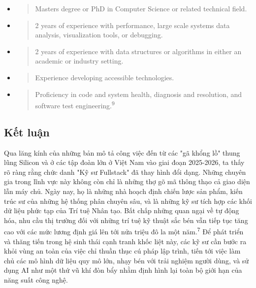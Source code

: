\documentclass[12pt,a4paper]{article}
\begin{document}
\begin{itemize}
\item
  \begin{quote}
  Master\textquotesingle s degree or PhD in Computer Science or related
  technical field.
  \end{quote}
\item
  \begin{quote}
  2 years of experience with performance, large scale systems data
  analysis, visualization tools, or debugging.
  \end{quote}
\item
  \begin{quote}
  2 years of experience with data structures or algorithms in either an
  academic or industry setting.
  \end{quote}
\item
  \begin{quote}
  Experience developing accessible technologies.
  \end{quote}
\item
  \begin{quote}
  Proficiency in code and system health, diagnosis and resolution, and
  software test engineering.\textsuperscript{9}
  \end{quote}
\end{itemize}

\subsection{Kết luận}
Qua lăng kính của những bản mô tả công việc đến từ các "gã khổng lồ"
thung lũng Silicon và ở các tập đoàn lớn ở Việt Nam vào giai đoạn 2025-2026, ta thấy rõ ràng rằng chức
danh "Kỹ sư Fullstack" đã thay hình đổi dạng. Những chuyên gia trong
lĩnh vực này không còn chỉ là những thợ gõ mã thông thạo cả giao diện
lẫn máy chủ. Ngày nay, họ là những nhà hoạch định chiến lược sản phẩm,
kiến trúc sư của những hệ thống phân chuyên sâu, và là những kỹ sư
tích hợp các khối dữ liệu phức tạp của Trí tuệ Nhân tạo. Bất chấp những quan ngại về tự động hóa, nhu cầu thị trường đối với
những trí tuệ kỹ thuật sắc bén vẫn tiếp tục tăng cao với các mức lương
định giá lên tới nửa triệu đô la một năm.\textsuperscript{7} Để phát
triển và thăng tiến trong hệ sinh thái cạnh tranh khốc liệt này, các kỹ
sư cần bước ra khỏi vùng an toàn của việc chỉ thuần thục cú pháp lập
trình, tiến tới việc làm chủ các mô hình dữ liệu quy mô lớn, nhạy bén
với trải nghiệm người dùng, và sử dụng AI như một thứ vũ khí đòn bẩy
nhằm định hình lại toàn bộ giới hạn của năng suất công nghệ.
\end{document}
